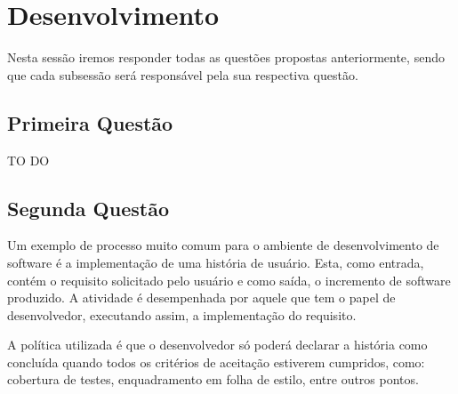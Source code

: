 \chapter[Desenvolvimento ]{Desenvolvimento}

Nesta sessão iremos responder todas as questões propostas anteriormente, sendo
que cada subsessão será responsável pela sua respectiva questão.

\section{Primeira Questão}
\label{sec:Primeira Questão}

TO DO

\section{Segunda Questão}
\label{sec:Segunda Questão}

Um exemplo de processo muito comum para o ambiente de desenvolvimento de software
é a implementação de uma história de usuário. Esta, como entrada, contém o
requisito solicitado pelo usuário e como saída, o incremento de software produzido.
A atividade é desempenhada por aquele que tem o papel de desenvolvedor, executando
assim, a implementação do requisito.

A política utilizada é que o desenvolvedor só poderá declarar a história como
concluída quando todos os critérios de aceitação estiverem cumpridos, como:
cobertura de testes, enquadramento em folha de estilo, entre outros pontos.
